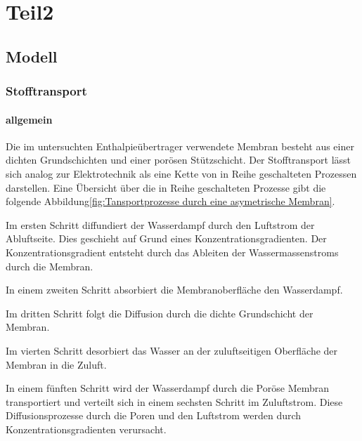 \chapter{Teil2}
\label{cha:Teil2}



\begin{normalsize}
\begin{LARGE}

\section{Modell}
\label{sec:Modell}


\subsection{Stofftransport}

\subsubsection{allgemein}

Die im untersuchten Enthalpieübertrager verwendete Membran besteht aus einer dichten Grundschichten und einer porösen Stützschicht. Der Stofftransport lässt sich analog zur Elektrotechnik als eine Kette von in Reihe geschalteten Prozessen darstellen. Eine Übersicht über die in Reihe geschalteten Prozesse gibt die folgende Abbildung\ref{fig:Tansportprozesse durch eine asymetrische Membran}.


Im ersten Schritt diffundiert der Wasserdampf durch den Luftstrom der Abluftseite. Dies geschieht auf Grund eines Konzentrationsgradienten. Der Konzentrationsgradient entsteht durch das Ableiten der Wassermassenstroms durch die Membran. 

In einem zweiten Schritt absorbiert die Membranoberfläche den Wasserdampf. 

Im dritten Schritt folgt die Diffusion durch die dichte Grundschicht der Membran. 

Im vierten Schritt desorbiert das Wasser an der zuluftseitigen Oberfläche der Membran in die Zuluft. 

In einem fünften Schritt wird der Wasserdampf durch die Poröse Membran transportiert und verteilt sich in einem sechsten Schritt im Zuluftstrom. Diese Diffusionsprozesse durch die Poren und den Luftstrom werden durch Konzentrationsgradienten verursacht.



\end{LARGE}
\end{normalsize}
